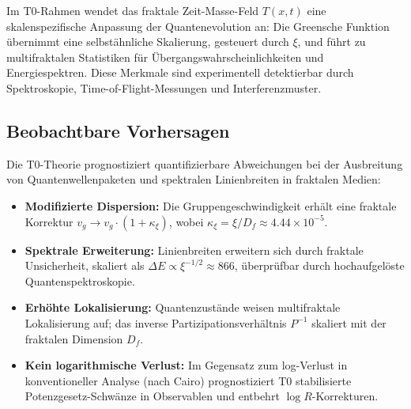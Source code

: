 	Im T0-Rahmen wendet das fraktale Zeit-Masse-Feld $T(x,t)$ eine skalenspezifische Anpassung der Quantenevolution an: Die Greensche Funktion übernimmt eine selbstähnliche Skalierung, gesteuert durch $\xi$, und führt zu multifraktalen Statistiken für Übergangswahrscheinlichkeiten und Energiespektren. Diese Merkmale sind experimentell detektierbar durch Spektroskopie, Time-of-Flight-Messungen und Interferenzmuster.
	
	\subsection{Beobachtbare Vorhersagen}
	
	Die T0-Theorie prognostiziert quantifizierbare Abweichungen bei der Ausbreitung von Quantenwellenpaketen und spektralen Linienbreiten in fraktalen Medien:
	
	\begin{itemize}
		\item \textbf{Modifizierte Dispersion:} Die Gruppengeschwindigkeit erhält eine fraktale Korrektur $v_g \to v_g \cdot (1 + \kappa_\xi)$, wobei $\kappa_\xi = \xi / D_f \approx 4.44 \times 10^{-5}$.
		\item \textbf{Spektrale Erweiterung:} Linienbreiten erweitern sich durch fraktale Unsicherheit, skaliert als $\Delta E \propto \xi^{-1/2} \approx 866$, überprüfbar durch hochaufgelöste Quantenspektroskopie.
		\item \textbf{Erhöhte Lokalisierung:} Quantenzustände weisen multifraktale Lokalisierung auf; das inverse Partizipationsverhältnis $P^{-1}$ skaliert mit der fraktalen Dimension $D_f$.
		\item \textbf{Kein logarithmische Verlust:} Im Gegensatz zum log-Verlust in konventioneller Analyse (nach Cairo) prognostiziert T0 stabilisierte Potenzgesetz-Schwänze in Observablen und entbehrt $\log R$-Korrekturen.
	\end{itemize}
	
	\begin{table}[htbp]
		\centering
		\caption{Beobachtbare Vorhersagen der T0 in fraktalen Quantensystemen}
		\label{tab:t0_predictions}
	\end{table}
	
